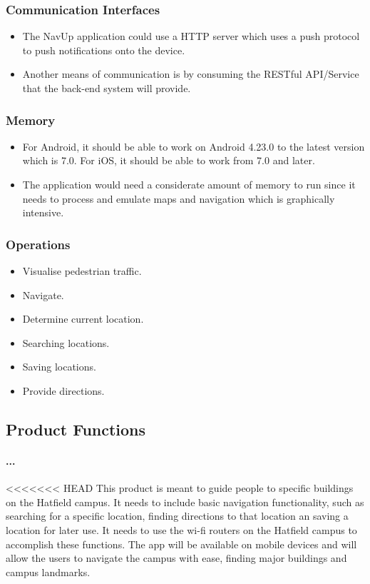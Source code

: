 \documentclass[runningheads,a4paper]{article}
\begin{document}
\subsubsection{Communication Interfaces}
\begin{itemize}
	\item 	The NavUp application could use a HTTP server which uses a push protocol to push notifications onto the device.
	\item  Another means of communication is by consuming the RESTful API/Service that the back-end system will provide.
\end{itemize}
\subsubsection{Memory}
\begin{itemize}
	\item For Android, it should be able to work on Android 4.23.0 to the latest version which is 7.0. For iOS, it should be able to work from 7.0 and later.
	\item The application would need a considerate amount of memory to run since it needs to process and emulate maps and navigation which is graphically intensive.
	
\end{itemize}
\subsubsection{Operations}
\begin{itemize}
	\item Visualise pedestrian traffic.
	\item Navigate.
	\item Determine current location.
	\item Searching locations.
	\item Saving locations.
	\item Provide directions.
	
\end{itemize}

\subsection{Product Functions}
\paragraph{...}
<<<<<<< HEAD
This product is meant to guide people to specific buildings on the Hatfield campus. It needs to include basic navigation functionality, such as searching for a specific location, finding directions to that location an saving a location for later use. It needs to use the wi-fi routers on the Hatfield campus to accomplish these functions.
The app will be available on mobile devices and will allow the users to navigate the campus with ease, finding major buildings and campus landmarks.
\end{document}
